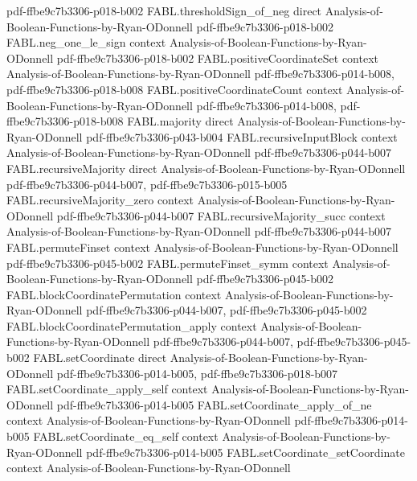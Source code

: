 \begin{theorem}
  {pdf-ffbe9c7b3306-p018-b002}
\proofstep
  {FABL.thresholdSign_of_neg}
  {direct}
  {Analysis-of-Boolean-Functions-by-Ryan-ODonnell}
  {pdf-ffbe9c7b3306-p018-b002}
\proofstep
  {FABL.neg_one_le_sign}
  {context}
  {Analysis-of-Boolean-Functions-by-Ryan-ODonnell}
  {pdf-ffbe9c7b3306-p018-b002}
\proofstep
  {FABL.positiveCoordinateSet}
  {context}
  {Analysis-of-Boolean-Functions-by-Ryan-ODonnell}
  {pdf-ffbe9c7b3306-p014-b008,
    pdf-ffbe9c7b3306-p018-b008}
\proofstep
  {FABL.positiveCoordinateCount}
  {context}
  {Analysis-of-Boolean-Functions-by-Ryan-ODonnell}
  {pdf-ffbe9c7b3306-p014-b008,
    pdf-ffbe9c7b3306-p018-b008}
\proofstep
  {FABL.majority}
  {direct}
  {Analysis-of-Boolean-Functions-by-Ryan-ODonnell}
  {pdf-ffbe9c7b3306-p043-b004}
\proofstep
  {FABL.recursiveInputBlock}
  {context}
  {Analysis-of-Boolean-Functions-by-Ryan-ODonnell}
  {pdf-ffbe9c7b3306-p044-b007}
\proofstep
  {FABL.recursiveMajority}
  {direct}
  {Analysis-of-Boolean-Functions-by-Ryan-ODonnell}
  {pdf-ffbe9c7b3306-p044-b007,
    pdf-ffbe9c7b3306-p015-b005}
\proofstep
  {FABL.recursiveMajority_zero}
  {context}
  {Analysis-of-Boolean-Functions-by-Ryan-ODonnell}
  {pdf-ffbe9c7b3306-p044-b007}
\proofstep
  {FABL.recursiveMajority_succ}
  {context}
  {Analysis-of-Boolean-Functions-by-Ryan-ODonnell}
  {pdf-ffbe9c7b3306-p044-b007}
\proofstep
  {FABL.permuteFinset}
  {context}
  {Analysis-of-Boolean-Functions-by-Ryan-ODonnell}
  {pdf-ffbe9c7b3306-p045-b002}
\proofstep
  {FABL.permuteFinset_symm}
  {context}
  {Analysis-of-Boolean-Functions-by-Ryan-ODonnell}
  {pdf-ffbe9c7b3306-p045-b002}
\proofstep
  {FABL.blockCoordinatePermutation}
  {context}
  {Analysis-of-Boolean-Functions-by-Ryan-ODonnell}
  {pdf-ffbe9c7b3306-p044-b007,
    pdf-ffbe9c7b3306-p045-b002}
\proofstep
  {FABL.blockCoordinatePermutation_apply}
  {context}
  {Analysis-of-Boolean-Functions-by-Ryan-ODonnell}
  {pdf-ffbe9c7b3306-p044-b007,
    pdf-ffbe9c7b3306-p045-b002}
\proofstep
  {FABL.setCoordinate}
  {direct}
  {Analysis-of-Boolean-Functions-by-Ryan-ODonnell}
  {pdf-ffbe9c7b3306-p014-b005,
    pdf-ffbe9c7b3306-p018-b007}
\proofstep
  {FABL.setCoordinate_apply_self}
  {context}
  {Analysis-of-Boolean-Functions-by-Ryan-ODonnell}
  {pdf-ffbe9c7b3306-p014-b005}
\proofstep
  {FABL.setCoordinate_apply_of_ne}
  {context}
  {Analysis-of-Boolean-Functions-by-Ryan-ODonnell}
  {pdf-ffbe9c7b3306-p014-b005}
\proofstep
  {FABL.setCoordinate_eq_self}
  {context}
  {Analysis-of-Boolean-Functions-by-Ryan-ODonnell}
  {pdf-ffbe9c7b3306-p014-b005}
\proofstep
  {FABL.setCoordinate_setCoordinate}
  {context}
  {Analysis-of-Boolean-Functions-by-Ryan-ODonnell}

\end{theorem}
